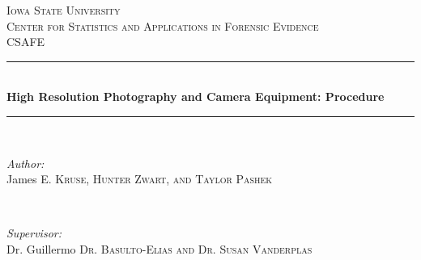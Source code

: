 \begin{titlepage}

\newcommand{\HRule}{\rule{\linewidth}{0.5mm}} %

\center %
 

\textsc{\LARGE Iowa State University}\\[1.5cm] %
\textsc{\Large Center for Statistics and Applications in Forensic Evidence}\\[0.5cm] %
\textsc{\large CSAFE }\\[0.5cm] %


\HRule \\[0.4cm]
{ \LARGE \bfseries High Resolution Photography and Camera Equipment: Procedure }\\[0.4cm] %
\HRule \\[1.5cm]
 

\begin{minipage}{0.4\textwidth}
\begin{flushleft} \large
\emph{Author:}\\
James \textsc{E. Kruse, Hunter Zwart, and Taylor Pashek} %
\end{flushleft}
\end{minipage}
~
\begin{minipage}{0.4\textwidth}
\begin{flushright} \large
\emph{Supervisor:} \\
Dr. Guillermo \textsc{Dr. Basulto-Elias and Dr. Susan Vanderplas} %
\end{flushright}
\end{minipage}\\[2cm]


\end{titlepage}
